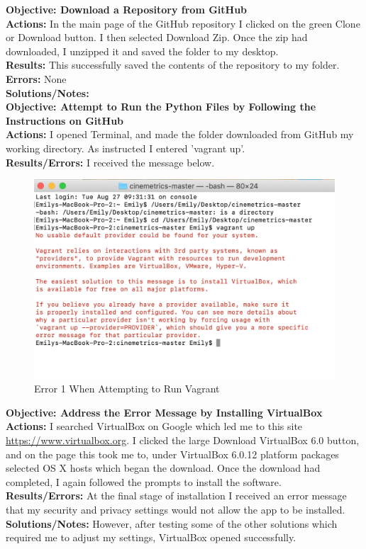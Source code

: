 \documentclass{article}
\begin{document}
\textbf{Objective: Download a Repository from GitHub}\\
\textbf{Actions:} In the main page of the GitHub repository I clicked on the green Clone or Download button. I then selected Download Zip. Once the zip had downloaded, I unzipped it and saved the folder to my desktop.\\
\textbf{Results:} This successfully saved the contents of the repository to my folder.\\
\textbf{Errors:} None\\
\textbf{Solutions/Notes:}\\

\textbf{Objective: Attempt to Run the Python Files by Following the Instructions on GitHub}\\
\textbf{Actions:} I opened Terminal, and made the folder downloaded from GitHub my working directory. As instructed I entered 'vagrant up'.\\
\textbf{Results/Errors:} I received the message below.
\begin{figure}[htp]
    \centering
    \includegraphics[width=12cm]{Vagrant_Image_1.png}
    \caption{Error 1 When Attempting to Run Vagrant}
\end{figure}

\textbf{Objective: Address the Error Message by Installing VirtualBox}\\
\textbf{Actions:} I searched VirtualBox on Google which led me to this site \url{https://www.virtualbox.org}. I clicked the large Download VirtualBox 6.0 button, and on the page this took me to, under VirtualBox 6.0.12 platform packages selected OS X hosts which began the download. Once the download had completed, I again followed the prompts to install the software.\\
\textbf{Results/Errors:} At the final stage of installation I received an error message that my security and privacy settings would not allow the app to be installed. \\
\textbf{Solutions/Notes:} However, after testing some of the other solutions which required me to adjust my settings, VirtualBox opened successfully.\\
\end{document}
